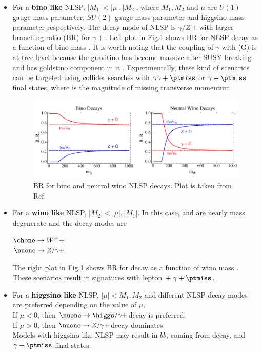 \begin{itemize}
\item For a \textbf{bino like} NLSP, $|M_1| < |\mu|, |M_2|$, where $M_1, M_2$ and $\mu$ are $U(1)$ gauge mass parameter, $SU(2)$ gauge mass parameter and higgsino mass parameter respectively. The decay mode of NLSP is $\gamma/Z +$\grav with larger branching ratio (BR) for  $\gamma +$\grav. Left plot in Fig.\ref{fig:NLSPwinoBinoBR} shows BR for NLSP decay as a function of bino mass \cite{Ruderman:2011vv}. It is worth noting that the coupling of $\gamma$ with \susyP(G) is at tree-level because the gravitino has become massive after SUSY breaking and has goldstino component in it \cite{Martin:1997ns}. Experimentally, these kind of scenarios can be targeted using collider searches with $\gamma\gamma+\ptmiss$ or $\gamma+\ptmiss$ final states, where \ptmiss is the magnitude of missing transverse momentum.

\begin{figure}[h!]
\centering
\includegraphics[width=0.8\linewidth]{../Figures/NLSPwinoBinoBR}
\caption[BR for bino and neutral wino NLSP decays]{BR for bino and neutral wino NLSP decays. Plot is taken from Ref.\cite{Ruderman:2011vv}}
\label{fig:NLSPwinoBinoBR}
\end{figure}

\item For a \textbf{wino like} NLSP, $|M_2| < |\mu|, |M_1|$. In this case, \nuone and \chone are nearly mass degenerate and the decay modes are
\begin{center}
$\chone \rightarrow W^\pm + $\grav \\%
$\nuone \rightarrow Z/\gamma + $\grav
\end{center}
The right plot in Fig.\ref{fig:NLSPwinoBinoBR} shows BR for \nuone decay as a function of wino mass \cite{Ruderman:2011vv}. These scenarios result in signatures with lepton $+\ \gamma+\ptmiss$.

\item For a \textbf{higgsino like} NLSP, $|\mu| < M_1,M_2$ and different NLSP decay modes are preferred depending on the value of $\mu$.\\
If $\mu < 0$, then $\nuone \rightarrow \higgs/\gamma + $\grav decay is preferred.\\
If $\mu > 0$, then $\nuone \rightarrow Z/\gamma + $\grav decay dominates.\\
Models with higgsino like NLSP may result in $b\bar{b}$, coming from \higgs decay, and $\gamma+\ptmiss$ final states.
\end{itemize}


